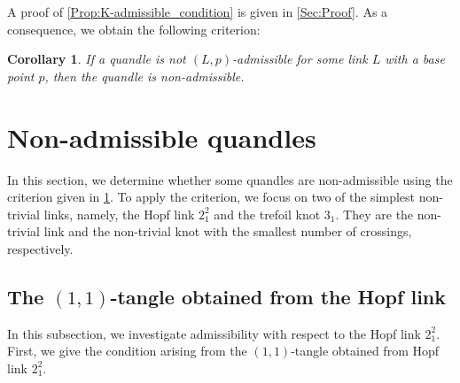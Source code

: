 \documentclass[12pt]{article}
\theoremstyle{plain}
\newtheorem{cor}[thm]{Corollary}
\theoremstyle{definition}
\begin{document}
A proof of \cref{Prop:K-admissible_condition} is given in \cref{Sec:Proof}.
As a consequence, we obtain the following criterion:
\begin{cor}\label{Cor:Non-admissible_condition}
  If a quandle is not $(L, p)$-admissible for some link $L$ with a base point $p$,
  then the quandle is non-admissible.
\end{cor}
\section{Non-admissible quandles}

In this section, we determine 
whether some quandles are non-admissible 
using the criterion given in \cref{Cor:Non-admissible_condition}.
To apply the criterion, we focus on two of the simplest non-trivial links, namely, the Hopf link $2_{1}^{2}$ and the trefoil knot $3_{1}$.
They are the non-trivial link and the non-trivial knot with the smallest number of crossings, respectively.

\subsection{The $(1,1)$-tangle obtained from the Hopf link}

In this subsection, we investigate admissibility with respect to the Hopf link $2_1^2$.
First, we give the condition arising from the $(1, 1)$-tangle obtained from Hopf link $2_{1}^{2}$. 
\end{document}
